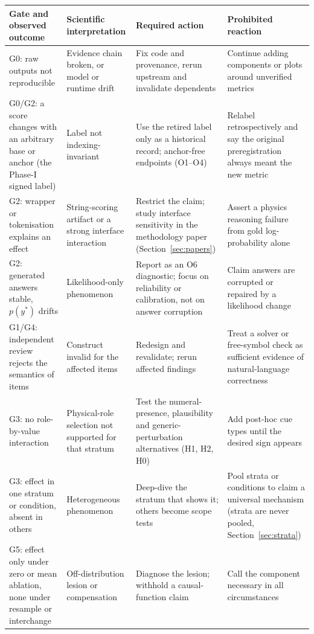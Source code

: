 \documentclass[10pt,a4paper]{article}
\begin{document}
{\small
\begin{longtable}{@{}P{3.3cm}P{3.5cm}P{4.2cm}P{4.0cm}@{}}
\toprule
Gate and observed outcome & Scientific interpretation & Required action & Prohibited reaction \\
\midrule
\endhead
\bottomrule
\endfoot
G0: raw outputs not reproducible & Evidence chain broken, or model or runtime drift & Fix code and provenance,
rerun upstream and invalidate dependents & Continue adding components or plots around unverified metrics \\
G0/G2: a score changes with an arbitrary base or anchor (the Phase-I signed label) & Label not
indexing-invariant & Use the retired label only as a historical record; anchor-free endpoints (O1--O4) &
Relabel retrospectively and say the original preregistration always meant the new metric \\
G2: wrapper or tokenisation explains an effect & String-scoring artifact or a strong interface interaction &
Restrict the claim; study interface sensitivity in the methodology paper (Section~\ref{sec:papers}) & Assert a
physics reasoning failure from gold log-probability alone \\
G2: generated answers stable, $p(y^*)$ drifts & Likelihood-only phenomenon & Report as an O6 diagnostic;
focus on reliability or calibration, not on answer corruption & Claim answers are corrupted or repaired by a
likelihood change \\
G1/G4: independent review rejects the semantics of items & Construct invalid for the affected items & Redesign
and revalidate; rerun affected findings & Treat a solver or free-symbol check as sufficient evidence of
natural-language correctness \\
G3: no role-by-value interaction & Physical-role selection not supported for that stratum & Test the
numeral-presence, plausibility and generic-perturbation alternatives (H1, H2, H0) & Add post-hoc cue types until
the desired sign appears \\
G3: effect in one stratum or condition, absent in others & Heterogeneous phenomenon & Deep-dive the stratum
that shows it; others become scope tests & Pool strata or conditions to claim a universal mechanism (strata are
never pooled, Section~\ref{sec:strata}) \\
G5: effect only under zero or mean ablation, none under resample or interchange & Off-distribution lesion or
compensation & Diagnose the lesion; withhold a causal-function claim & Call the component necessary in all
circumstances \\

\end{longtable}}
\end{document}
